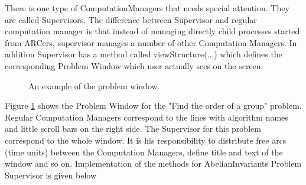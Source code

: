 \documentclass[12pt]{article}
\begin{document}
  There is one type of ComputationManagers that needs special attention. 
  They are called Supervisors. The difference between Supervisor and regular 
  computation
   manager is that instead of managing directly child processes started from 
  ARCers, 
  supervisor manages a number of other Computation Managers. In addition 
  Supervisor has
   a method called viewStructure(...) which defines the corresponding Problem 
  Window which
  user actually sees on the screen.

  \begin{figure}[h]
   \centerline{  }
  \caption{An example of the problem window.}
  \label{OPWin}
  \end{figure}                             

   Figure \ref{OPWin} shows the Problem  Window for the "Find the order of a 
  group" 
  problem. Regular Computation Managers correspond to the lines with algorithm 
  names and
   little scroll bars on the right side. The Supervisor for this problem 
  correspond to
   the whole window. It is his responsibility to distribute free arcs (time units)
   between the  Computation Managers, define title and text of the window and so 
  on. 
  Implementation of the methods for AbelianInvariants Problem Supervisor is given 
  below
\end{document}
